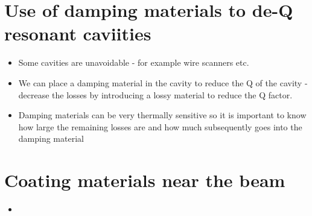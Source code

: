 \begin{enumerate}
\section{Use of damping materials to de-Q resonant caviities}
\begin{itemize}
\item{Some cavities are unavoidable - for example wire scanners etc.}
\item{We can place a damping material in the cavity to reduce the Q of the cavity - decrease the losses by introducing a lossy material to reduce the Q factor.}
\item{Damping materials can be very thermally sensitive so it is important to know how large the remaining losses are and how much subsequently goes into the damping material}
\end{itemize}

\section{Coating materials near the beam}
\begin{itemize}
\item{}
\end{itemize}

\end{enumerate}